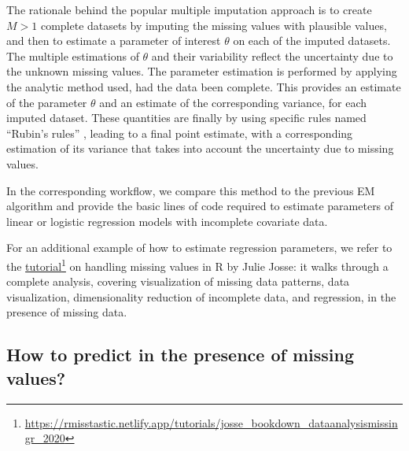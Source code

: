 The rationale behind the popular multiple imputation approach is to create $M>1$ complete datasets by imputing the missing values with plausible values, and then to estimate a parameter of interest $\theta$ on each of the imputed datasets. The multiple estimations of $\theta$ and their variability reflect the uncertainty due to the unknown missing values. The parameter estimation is performed by applying the analytic method used, had the data been complete. This provides an estimate of the parameter $\theta$ and an estimate of the corresponding variance, for each imputed dataset. These quantities are finally  by using specific rules named ``Rubin’s rules'' \citep{rubin2004multiple}, leading to a final point estimate, with a corresponding estimation of its variance that takes into account the uncertainty due to missing values. 



In the corresponding workflow, we compare this method to the previous EM algorithm and provide the basic lines of code required to estimate parameters of linear or logistic regression models with incomplete covariate data.

For an additional example of how to estimate regression parameters, we refer to the \href{https://rmisstastic.netlify.app/tutorials/josse_bookdown_dataanalysismissingr_2020}{ tutorial}\footnote{\url{https://rmisstastic.netlify.app/tutorials/josse_bookdown_dataanalysismissingr_2020}} on handling missing values in {R} by Julie Josse: it walks through a complete analysis, covering visualization of missing data patterns, data visualization, dimensionality reduction of incomplete data, and regression, in the presence of missing data.  

\subsection{How to predict in the presence of missing values?}
\label{sec:howtopred}

